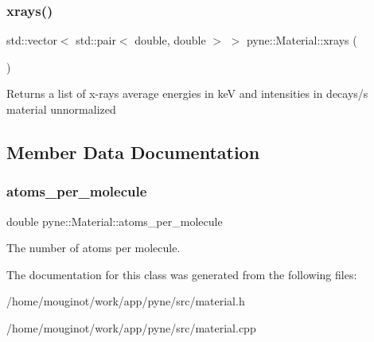 \subsubsection{\texorpdfstring{xrays()}{xrays()}}
{\footnotesize\ttfamily std\+::vector$<$ std\+::pair$<$ double, double $>$ $>$ pyne\+::\+Material\+::xrays (\begin{DoxyParamCaption}{ }\end{DoxyParamCaption})}

Returns a list of x-\/rays average energies in keV and intensities in decays/s material unnormalized 

\subsection{Member Data Documentation}
\mbox{\label{classpyne_1_1_material_a7ddff1aaebc94bcda22d3422c093a756}} 
\subsubsection{\texorpdfstring{atoms\+\_\+per\+\_\+molecule}{atoms\_per\_molecule}}
{\footnotesize\ttfamily double pyne\+::\+Material\+::atoms\+\_\+per\+\_\+molecule}

The number of atoms per molecule. 

The documentation for this class was generated from the following files\+:\begin{DoxyCompactItemize}
\item 
/home/mouginot/work/app/pyne/src/material.\+h\item 
/home/mouginot/work/app/pyne/src/material.\+cpp\end{DoxyCompactItemize}
